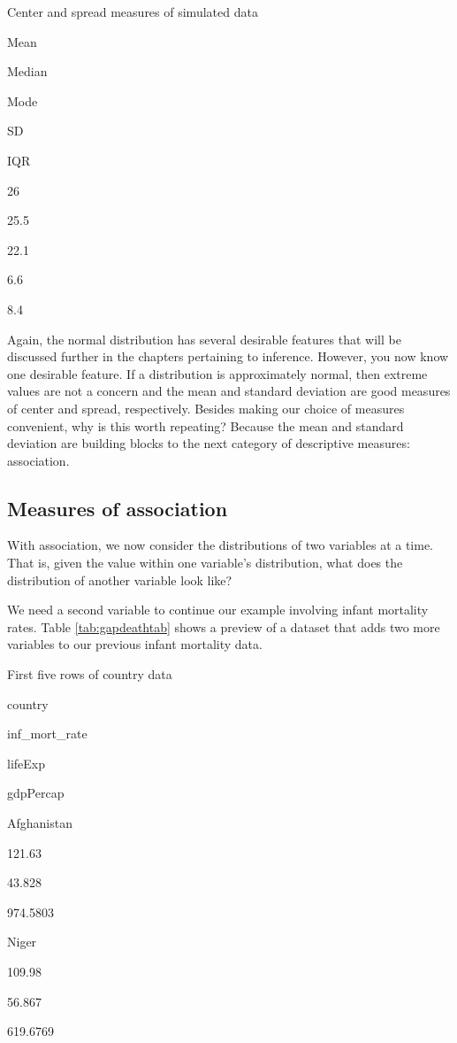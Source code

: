 \documentclass[
]{book}
\begin{document}
\label{tab:normratesum}Center and spread measures of simulated data

Mean

Median

Mode

SD

IQR

26

25.5

22.1

6.6

8.4

Again, the normal distribution has several desirable features that will be discussed further in the chapters pertaining to inference. However, you now know one desirable feature. If a distribution is approximately normal, then extreme values are not a concern and the mean and standard deviation are good measures of center and spread, respectively. Besides making our choice of measures convenient, why is this worth repeating? Because the mean and standard deviation are building blocks to the next category of descriptive measures: association.

\hypertarget{measures-of-association}{%
\subsection{Measures of association}\label{measures-of-association}}

With association, we now consider the distributions of two variables at a time. That is, given the value within one variable's distribution, what does the distribution of another variable look like?

We need a second variable to continue our example involving infant mortality rates. Table \ref{tab:gapdeathtab} shows a preview of a dataset that adds two more variables to our previous infant mortality data.

\label{tab:gapdeathtab}First five rows of country data

country

inf\_mort\_rate

lifeExp

gdpPercap

Afghanistan

121.63

43.828

974.5803

Niger

109.98

56.867

619.6769
\end{document}
